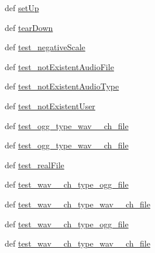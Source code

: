 \begin{DoxyCompactItemize}
\item 
def \hyperlink{classdenoise__unit__tests_1_1TestAudioProcessing_a7de102218fb2997e1ee3eb54f019716b}{set\-Up}
\item 
def \hyperlink{classdenoise__unit__tests_1_1TestAudioProcessing_a0b5ba548d4ed4c51c433e2ec4e3ebe74}{tear\-Down}
\item 
def \hyperlink{classdenoise__unit__tests_1_1TestAudioProcessing_ae1a17e135285902d2d1994b0a3f097b5}{test\-\_\-negative\-Scale}
\item 
def \hyperlink{classdenoise__unit__tests_1_1TestAudioProcessing_abb6cbcda08af0c243a5d561433b32a70}{test\-\_\-not\-Existent\-Audio\-File}
\item 
def \hyperlink{classdenoise__unit__tests_1_1TestAudioProcessing_abef05168d2756e37aed2689423b62402}{test\-\_\-not\-Existent\-Audio\-Type}
\item 
def \hyperlink{classdenoise__unit__tests_1_1TestAudioProcessing_abb7c4de41acad528eb555ffa3f4569a7}{test\-\_\-not\-Existent\-User}
\item 
def \hyperlink{classdenoise__unit__tests_1_1TestAudioProcessing_aa5aa322c8e8c137b2df7abb7b28b8430}{test\-\_\-ogg\-\_\-type\-\_\-wav\-\_\-\_\-ch\-\_\-file}
\item 
def \hyperlink{classdenoise__unit__tests_1_1TestAudioProcessing_a8ab2e76b611895890ba4e5e0894a4437}{test\-\_\-ogg\-\_\-type\-\_\-wav\-\_\-\_\-ch\-\_\-file}
\item 
def \hyperlink{classdenoise__unit__tests_1_1TestAudioProcessing_aec16b59a6ea0211f8fd79d4ca4d68cb4}{test\-\_\-real\-File}
\item 
def \hyperlink{classdenoise__unit__tests_1_1TestAudioProcessing_a0a82f099904bbeec84a9416b5c8b9af6}{test\-\_\-wav\-\_\-\_\-ch\-\_\-type\-\_\-ogg\-\_\-file}
\item 
def \hyperlink{classdenoise__unit__tests_1_1TestAudioProcessing_a9ac397525cbf072a7b5c7507cfc3f850}{test\-\_\-wav\-\_\-\_\-ch\-\_\-type\-\_\-wav\-\_\-\_\-ch\-\_\-file}
\item 
def \hyperlink{classdenoise__unit__tests_1_1TestAudioProcessing_aedebea8664cc5588c78083fd4cb00ffa}{test\-\_\-wav\-\_\-\_\-ch\-\_\-type\-\_\-ogg\-\_\-file}
\item 
def \hyperlink{classdenoise__unit__tests_1_1TestAudioProcessing_a1592faaf83d011ff61520ad7dbac9875}{test\-\_\-wav\-\_\-\_\-ch\-\_\-type\-\_\-wav\-\_\-\_\-ch\-\_\-file}
\end{DoxyCompactItemize}
